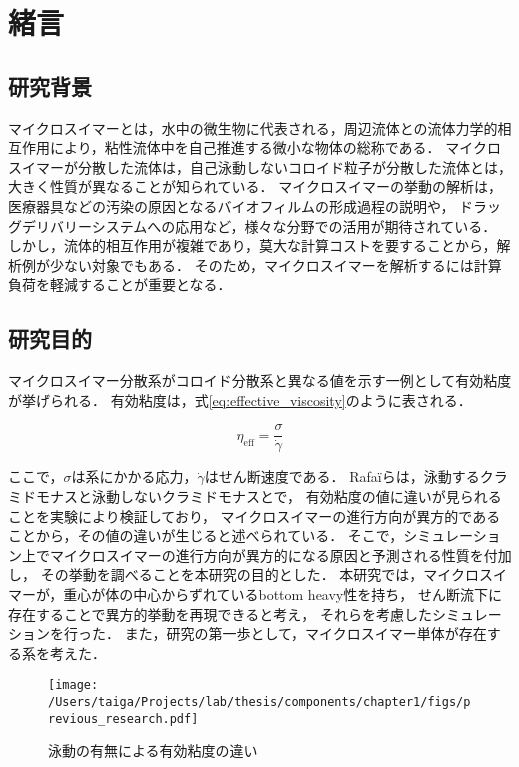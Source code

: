 \documentclass[11pt, a4j, dvipdfmx]{jarticle}
\begin{document}
\section{緒言}
\label{sec:introdction}


\subsection{研究背景}
\par
マイクロスイマーとは，水中の微生物に代表される，周辺流体との流体力学的相互作用により，粘性流体中を自己推進する微小な物体の総称である．
マイクロスイマーが分散した流体は，自己泳動しないコロイド粒子が分散した流体とは，大きく性質が異なることが知られている．
マイクロスイマーの挙動の解析は，医療器具などの汚染の原因となるバイオフィルムの形成過程の説明や，
ドラッグデリバリーシステムへの応用など，様々な分野での活用が期待されている．
しかし，流体的相互作用が複雑であり，莫大な計算コストを要することから，解析例が少ない対象でもある．
そのため，マイクロスイマーを解析するには計算負荷を軽減することが重要となる．


\subsection{研究目的}
\par
マイクロスイマー分散系がコロイド分散系と異なる値を示す一例として有効粘度が挙げられる．
有効粘度は，式\eqref{eq:effective_viscosity}のように表される．

    \begin{equation}
        \eta_\mathrm{eff} = \frac{\sigma}{\dot{\gamma}}
        \label{eq:effective_viscosity}
    \end{equation}

\noindent
ここで，$\sigma$は系にかかる応力，$\dot{\gamma}$はせん断速度である．
Rafa\"iらは，泳動するクラミドモナスと泳動しないクラミドモナスとで，
有効粘度の値に違いが見られることを実験により検証しており，
マイクロスイマーの進行方向が異方的であることから，その値の違いが生じると述べられている\cite{}．
そこで，シミュレーション上でマイクロスイマーの進行方向が異方的になる原因と予測される性質を付加し，
その挙動を調べることを本研究の目的とした．
本研究では，マイクロスイマーが，重心が体の中心からずれているbottom heavy性を持ち，
せん断流下に存在することで異方的挙動を再現できると考え，
それらを考慮したシミュレーションを行った．
また，研究の第一歩として，マイクロスイマー単体が存在する系を考えた．

    \begin{figure}[H]
        \centering
        \texttt{[image: /Users/taiga/Projects/lab/thesis/components/chapter1/figs/previous\_research.pdf]}
        \caption{泳動の有無による有効粘度の違い}
    \end{figure}
\end{document}

